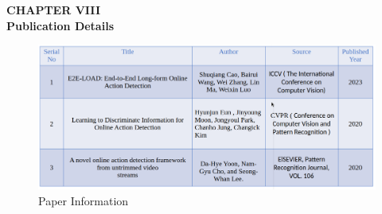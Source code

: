 \section*{}
\begin{center}
    {\fontsize{14}{1.5}\selectfont \textbf{CHAPTER VIII}}\\
    \vspace{12pt}
    {\fontsize{16}{1.5}\selectfont \textbf{Publication Details
}}\\
    \vspace{12pt}
    \vspace{12pt}
\end{center}
\setcounter{section}{8}
\setcounter{subsection}{0}
\renewcommand{\theequation}{\thesection.\arabic{equation}}
\renewcommand{\thetable}{\thesection.\arabic{table}}
\renewcommand{\thefigure}{\thesection.\arabic{figure}}
\setcounter{table}{0}
\setcounter{figure}{0}
\setcounter{equation}{0}

\begin{figure}[htbp]
    \centering
    \includegraphics[width=6.5in]{img/publication.png}
    \caption{Paper Information}
    \label{fig:example}
\end{figure}

